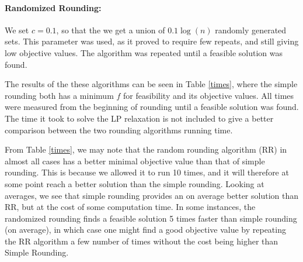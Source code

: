 \documentclass[12pt]{article}
\begin{document}
\paragraph{Randomized Rounding:} We set $c=0.1$, so that the we get a union of $0.1\log(n)$ randomly generated sets. This parameter was used, as it proved to require few repeats, and still giving low objective values. The algorithm was repeated until a feasible solution was found.

The results of the these algorithms can be seen in Table \ref{times}, where the simple rounding both has a minimum $f$ for feasibility and its objective values. All times were measured from the beginning of rounding until a feasible solution was found. The time it took to solve the LP relaxation is not included to give a better comparison between the two rounding algorithms running time.

From Table \ref{times}, we may note that the random rounding algorithm (RR) in almost all cases has a better minimal objective value than that of simple rounding. This is because we allowed it to run 10 times, and it will therefore at some point reach a better solution than the simple rounding. Looking at averages, we see that simple rounding provides an on average better solution than RR, but at the cost of some computation time. In some instances, the randomized rounding finds a feasible solution 5 times faster than simple rounding (on average), in which case one might find a good objective value by repeating the RR algorithm a few number of times without the cost being higher than Simple Rounding.  
\end{document}
